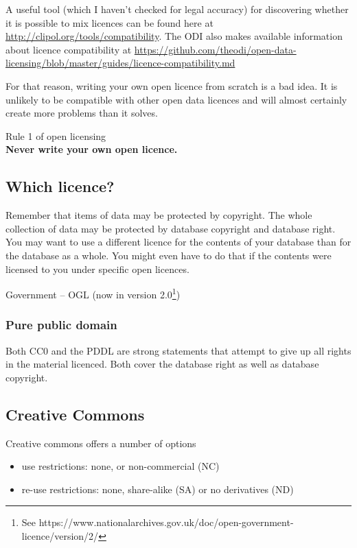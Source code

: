 A useful tool (which I haven't checked for legal accuracy) for
discovering whether it is possible to mix licences can be found here at
\url{http://clipol.org/tools/compatibility}. The ODI also makes
available information about licence compatibility at
\url{https://github.com/theodi/open-data-licensing/blob/master/guides/licence-compatibility.md}

For that reason, writing your own open licence from scratch is a bad
idea. It is unlikely to be compatible with other open data licences and
will almost certainly create more problems than it solves.

Rule 1 of open licensing\\ \textbf{Never write your own open licence.}

\subsection{Which licence?}\label{which-licence}

Remember that items of data may be protected by copyright. The whole
collection of data may be protected by database copyright and database
right. You may want to use a different licence for the contents of your
database than for the database as a whole. You might even have to do
that if the contents were licensed to you under specific open licences.

Government -- OGL (now in version 2.0\footnote{See
  https://www.nationalarchives.gov.uk/doc/open-government-licence/version/2/})

\subsubsection{Pure public domain}\label{pure-public-domain}

Both CC0 and the PDDL are strong statements that attempt to give up all
rights in the material licenced. Both cover the database right as well
as database copyright.

\subsection{Creative Commons}\label{creative-commons}

Creative commons offers a number of options

\begin{itemize}
\item
  use restrictions: none, or non-commercial (NC)
\item
  re-use restrictions: none, share-alike (SA) or no derivatives (ND)
\end{itemize}

